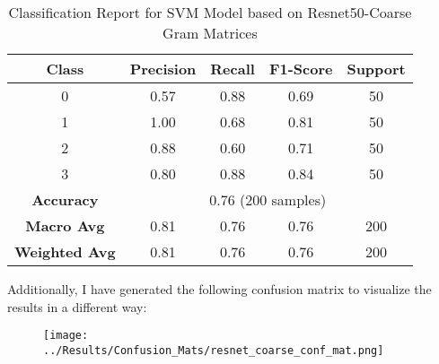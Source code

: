\documentclass{article}
\begin{document}
\begin{table}[h!]
    \centering
    \begin{tabular}{|c|c|c|c|c|}
        \hline
        Class & Precision & Recall & F1-Score & Support \\
        \hline
        0 & 0.57 & 0.88 & 0.69 & 50 \\
        1 & 1.00 & 0.68 & 0.81 & 50 \\
        2 & 0.88 & 0.60 & 0.71 & 50 \\
        3 & 0.80 & 0.88 & 0.84 & 50 \\
        \hline
        \multicolumn{1}{|c|}{\textbf{Accuracy}} & \multicolumn{4}{c|}{0.76 (200 samples)} \\
        \hline
        \multicolumn{1}{|c|}{\textbf{Macro Avg}} & 0.81 & 0.76 & 0.76 & 200 \\
        \multicolumn{1}{|c|}{\textbf{Weighted Avg}} & 0.81 & 0.76 & 0.76 & 200 \\
        \hline
    \end{tabular}
    \caption{Classification Report for SVM Model based on Resnet50-Coarse Gram Matrices}
    \label{tab:classification_report-resentcoarse}
\end{table}

Additionally, I have generated the following confusion matrix to visualize the results in a different way:

\begin{figure}[H]
    \centering
    \texttt{[image: ../Results/Confusion\_Mats/resnet\_coarse\_conf\_mat.png]}
    \label{fig:resnet-coarse-conf-mat}
\end{figure}
\end{document}
